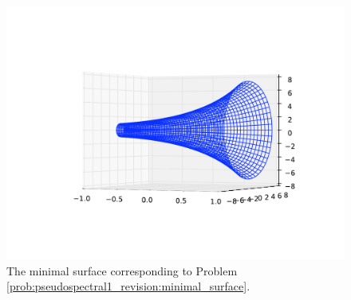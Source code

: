 \begin{figure}
\centering
\includegraphics[width=\textwidth]{minimal_surface.pdf}
\caption{The minimal surface corresponding to Problem  \ref{prob:pseudospectral1_revision:minimal_surface}.}
\label{fig:pseudospectral1_revision:minimal_surface}
\end{figure}








